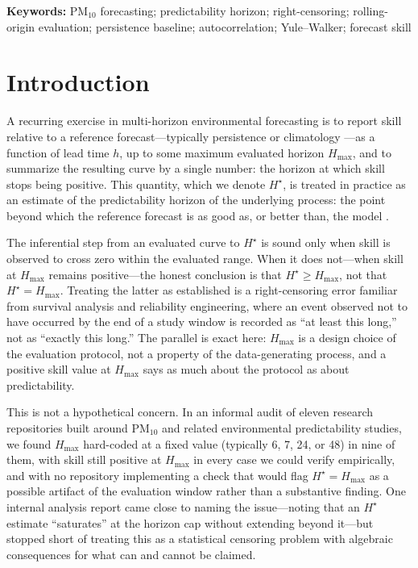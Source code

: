 \documentclass{article}
\newcommand{\keywords}[1]{\par\noindent\textbf{Keywords:} #1\par}
\newcommand{\hstar}{H^{\star}}
\begin{document}
\keywords{PM$_{10}$ forecasting; predictability horizon; right-censoring;
rolling-origin evaluation; persistence baseline; autocorrelation; Yule--Walker;
forecast skill}

\section{Introduction}

A recurring exercise in multi-horizon environmental forecasting is to report
skill relative to a reference forecast---typically persistence or climatology
---as a function of lead time $h$, up to some maximum evaluated horizon
$H_{\max}$, and to summarize the resulting curve by a single number: the
horizon at which skill stops being positive.
This quantity, which we denote $\hstar$, is treated in practice as an estimate
of the predictability horizon of the underlying process: the point beyond
which the reference forecast is as good as, or better than, the model
\citep{murphy1992}.

The inferential step from an evaluated curve to $\hstar$ is sound only when
skill is observed to cross zero within the evaluated range.
When it does not---when skill at $H_{\max}$ remains positive---the honest
conclusion is that $\hstar \ge H_{\max}$, not that $\hstar = H_{\max}$.
Treating the latter as established is a right-censoring error familiar from
survival analysis and reliability engineering, where an event observed not to
have occurred by the end of a study window is recorded as ``at least this
long,'' not as ``exactly this long.''
The parallel is exact here: $H_{\max}$ is a design choice of the evaluation
protocol, not a property of the data-generating process, and a positive skill
value at $H_{\max}$ says as much about the protocol as about predictability.

This is not a hypothetical concern.
In an informal audit of eleven research repositories built around PM$_{10}$
and related environmental predictability studies, we found $H_{\max}$
hard-coded at a fixed value (typically 6, 7, 24, or 48) in nine of them, with
skill still positive at $H_{\max}$ in every case we could verify empirically,
and with no repository implementing a check that would flag $\hstar =
H_{\max}$ as a possible artifact of the evaluation window rather than a
substantive finding.
One internal analysis report came close to naming the issue---noting that an
$\hstar$ estimate ``saturates'' at the horizon cap without extending beyond
it---but stopped short of treating this as a statistical censoring problem
with algebraic consequences for what can and cannot be claimed.
\end{document}
